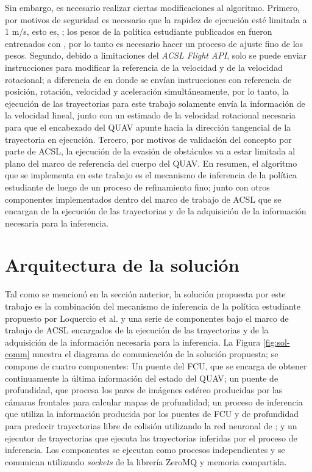 Sin embargo, es necesario realizar ciertas modificaciones al algoritmo. Primero, por motivos de seguridad es necesario que la rapidez de ejecución esté limitada a 1 m/s, esto es, ; los pesos de la política estudiante publicados en \cite{Loquercio2021} fueron entrenados con , por lo tanto es necesario hacer un proceso de ajuste fino de los pesos. Segundo, debido a limitaciones del \textit{ACSL Flight API}, solo se puede enviar instrucciones para modificar la referencia de la velocidad y de la velocidad rotacional; a diferencia de \cite{Loquercio2021} en donde se envían instrucciones con referencia de posición, rotación, velocidad y aceleración simultáneamente, por lo tanto, la ejecución de las trayectorias para este trabajo solamente envía la información de la velocidad lineal, junto con un estimado de la velocidad rotacional necesaria para que el encabezado del QUAV apunte hacia la dirección tangencial de la trayectoria en ejecución. Tercero, por motivos de validación del concepto por parte de ACSL, la ejecución de la evasión de obstáculos va a estar limitada al plano  del marco de referencia del cuerpo del QUAV. En resumen, el algoritmo que se implementa en este trabajo es el mecanismo de inferencia de la política estudiante de \cite{Loquercio2021} luego de un proceso de refinamiento fino; junto con otros componentes implementados dentro del marco de trabajo de ACSL que se encargan de la ejecución de las trayectorias y de la adquisición de la información necesaria para la inferencia.

\section{Arquitectura de la solución}

\label{sec:imp-arch}

Tal como se mencionó en la sección anterior, la solución propuesta por este trabajo es la combinación del mecanismo de inferencia de la política estudiante propuesto por Loquercio et al. \cite{Loquercio2021} y una serie de componentes bajo el marco de trabajo de ACSL encargados de la ejecución de las trayectorias y de la adquisición de la información necesaria para la inferencia. La Figura \ref{fig:sol-comm} muestra el diagrama de comunicación de la solución propuesta; se compone de cuatro componentes: Un puente del FCU, que se encarga de obtener continuamente la última información del estado del QUAV; un puente de profundidad, que procesa los pares de imágenes estéreo producidas por las cámaras frontales para calcular mapas de profundidad; un proceso de inferencia que utiliza la información producida por los puentes de FCU y de profundidad para predecir trayectorias libre de colisión utilizando la red neuronal de \cite{Loquercio2021}; y un ejecutor de trayectorias que ejecuta las trayectorias inferidas por el proceso de inferencia. Los componentes se ejecutan como procesos independientes y se comunican utilizando  \textit{sockets} de la librería ZeroMQ \cite{zeroMQ} y memoria compartida.


